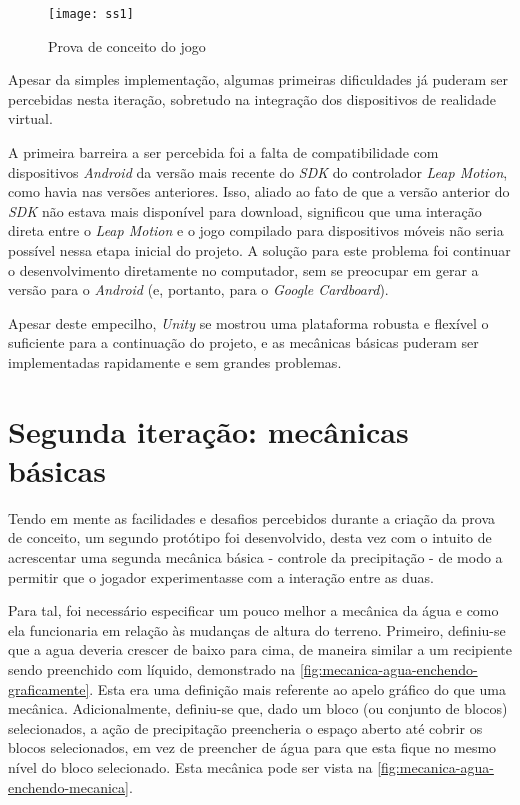 \begin{figure}[h]
	\centering
	\caption{Prova de conceito do jogo}
	\texttt{[image: ss1]}
	\legend{\fonteAP}
	\label{fig:primeiro-screenshot-terra}
\end{figure}

Apesar da simples implementação, algumas primeiras dificuldades já puderam 
ser percebidas nesta iteração, sobretudo na integração dos dispositivos de 
realidade virtual.

A primeira barreira a ser percebida foi a falta de compatibilidade com 
dispositivos \textit{Android} da versão mais recente do \textit{SDK} do 
controlador \textit{Leap Motion}, como havia nas versões anteriores. Isso, aliado 
ao fato de que a versão anterior do \textit{SDK} não estava mais disponível 
para download, significou que uma interação direta entre o \textit{Leap Motion} 
e o jogo compilado para dispositivos móveis não seria possível nessa etapa 
inicial do projeto. A solução para este problema foi continuar o desenvolvimento
diretamente no computador, sem se preocupar em gerar a versão para o 
\textit{Android} (e, portanto, para o \textit{Google Cardboard}).

Apesar deste empecilho, \textit{Unity} se mostrou uma plataforma robusta e 
flexível o suficiente para a continuação do projeto, e as mecânicas básicas 
puderam ser implementadas rapidamente e sem grandes problemas.

\section{Segunda iteração: mecânicas básicas}\label{sec-segunda-iteracao-mecanicas-basicas}

Tendo em mente as facilidades e desafios percebidos durante a criação da prova 
de conceito, um segundo protótipo foi desenvolvido, desta vez com o intuito 
de acrescentar uma segunda mecânica básica - controle da precipitação - de modo
a permitir que o jogador experimentasse com a interação entre as duas.

Para tal, foi necessário especificar um pouco melhor a mecânica da água 
e como ela funcionaria em relação às mudanças de altura do terreno. 
Primeiro, definiu-se que a agua deveria crescer de baixo para cima, de
maneira similar a um recipiente sendo preenchido com líquido, demonstrado
na \autoref{fig:mecanica-agua-enchendo-graficamente}. Esta era uma
definição mais referente ao apelo gráfico do que uma mecânica. Adicionalmente, 
definiu-se que, dado um bloco (ou conjunto de blocos) selecionados, a ação de
precipitação preencheria o espaço aberto até cobrir os blocos selecionados, em 
vez de preencher de água para que esta fique no mesmo nível do bloco selecionado.
Esta mecânica pode ser vista na \autoref{fig:mecanica-agua-enchendo-mecanica}.

